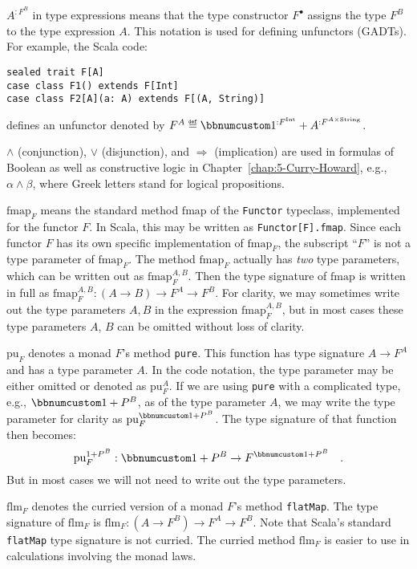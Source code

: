 $A^{:F^{B}}$ in type expressions means that the type constructor
$F^{\bullet}$ assigns the type $F^{B}$ to the type expression $A$.
This notation is used for defining unfunctors (GADTs). For example,
the Scala code:

\begin{lstlisting}
sealed trait F[A]
case class F1() extends F[Int]
case class F2[A](a: A) extends F[(A, String)]
\end{lstlisting}
defines an unfunctor denoted by $F^{A}\triangleq\bbnum 1^{:F^{\text{Int}}}+A^{:F^{A\times\text{String}}}$.

$\wedge$ (conjunction), $\vee$ (disjunction), and $\Rightarrow$
(implication) are used in formulas of Boolean as well as constructive
logic in Chapter~\ref{chap:5-Curry-Howard}, e.g., $\alpha\wedge\beta$,
where Greek letters stand for logical propositions.

$\text{fmap}_{F}$ means the standard method $\text{fmap}$ of the
\lstinline!Functor! typeclass, implemented for the functor $F$.
In Scala, this may be written as \texttt{}\lstinline!Functor[F].fmap!.
Since each functor $F$ has its own specific implementation of $\text{fmap}_{F}$,
the subscript \textsf{``}$F$\textsf{''} is not a type parameter of $\text{fmap}_{F}$.
The method $\text{fmap}_{F}$ actually has \emph{two} type parameters,
which can be written out as $\text{fmap}_{F}^{A,B}$. Then the type
signature of $\text{fmap}$ is written in full as $\text{fmap}_{F}^{A,B}:\left(A\rightarrow B\right)\rightarrow F^{A}\rightarrow F^{B}$.
For clarity, we may sometimes write out the type parameters $A,B$
in the expression $\text{fmap}_{F}^{A,B}$, but in most cases these
type parameters $A$, $B$ can be omitted without loss of clarity.

$\text{pu}_{F}$ denotes a monad $F$\textsf{'}s method \lstinline!pure!.
This function has type signature $A\rightarrow F^{A}$ and has a type
parameter $A$. In the code notation, the type parameter may be either
omitted or denoted as $\text{pu}_{F}^{A}$. If we are using \lstinline!pure!
with a complicated type, e.g., $\bbnum 1+P^{B}$, as of the type parameter
$A$, we may write the type parameter for clarity as $\text{pu}_{F}^{\bbnum 1+P^{B}}$.
The type signature of that function then becomes: 
\[
\text{pu}_{F}^{1+P^{B}}:\bbnum 1+P^{B}\rightarrow F^{\bbnum 1+P^{B}}\quad.
\]
But in most cases we will not need to write out the type parameters.

$\text{flm}_{F}$ denotes the curried version of a monad $F$\textsf{'}s method
\lstinline!flatMap!. The type signature of $\text{flm}_{F}$ is $\text{flm}_{F}:(A\rightarrow F^{B})\rightarrow F^{A}\rightarrow F^{B}$.
Note that Scala\textsf{'}s standard \lstinline!flatMap! type signature is
not curried. The curried method $\text{flm}_{F}$ is easier to use
in calculations involving the monad laws.


